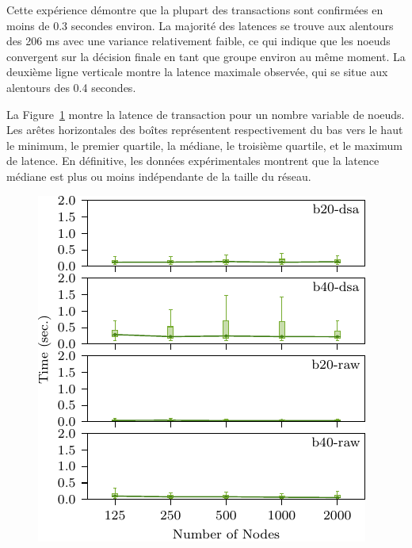 Cette expérience démontre que la plupart des transactions sont confirmées en moins de 0.3 secondes environ.
La majorité des latences se trouve aux alentours des 206 ms avec une variance relativement faible, ce qui
indique que les noeuds convergent sur la décision finale en tant que groupe environ au même moment. La deuxième
ligne verticale montre la latence maximale observée, qui se situe aux alentours des 0.4 secondes.

La Figure~\ref{fig:eval-lat2} montre la latence de transaction pour un nombre variable de noeuds. Les arêtes
horizontales des boîtes représentent respectivement du bas vers le haut le minimum, le premier quartile, la médiane,
le troisième quartile, et le maximum de latence. En définitive, les données expérimentales montrent que la latence
médiane est plus ou moins indépendante de la taille du réseau.

\begin{figure}[h]
\includegraphics[width=\linewidth]{figures/lat2.pdf}
\label{fig:eval-lat2}
\end{figure}

